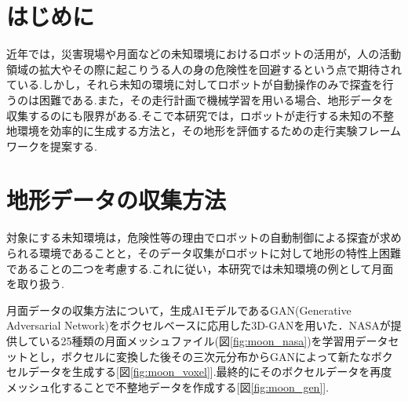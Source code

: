 \documentclass[a4paper,twocolumn,9pt]{jsarticle}
\begin{document}
\TitleText

\section{はじめに}
近年では，災害現場や月面などの未知環境におけるロボットの活用が，人の活動領域の拡大やその際に起こりうる人の身の危険性を回避するという点で期待されている.しかし，それら未知の環境に対してロボットが自動操作のみで探査を行うのは困難である.また，その走行計画で機械学習を用いる場合、地形データを収集するのにも限界がある.そこで本研究では，ロボットが走行する未知の不整地環境を効率的に生成する方法と，その地形を評価するための走行実験フレームワークを提案する.

\section{地形データの収集方法}
対象にする未知環境は，危険性等の理由でロボットの自動制御による探査が求められる環境であることと，そのデータ収集がロボットに対して地形の特性上困難であることの二つを考慮する.これに従い，本研究では未知環境の例として月面を取り扱う.

月面データの収集方法について，生成AIモデルであるGAN(Generative Adversarial Network)をボクセルベースに応用した3D-GAN\cite{bunken1}を用いた．NASAが提供している25種類の月面メッシュファイル(図\ref{fig:moon_nasa})を学習用データセットとし，ボクセルに変換した後その三次元分布からGANによって新たなボクセルデータを生成する[図\ref{fig:moon_voxel}].最終的にそのボクセルデータを再度メッシュ化することで不整地データを作成する[図\ref{fig:moon_gen}].
\end{document}
